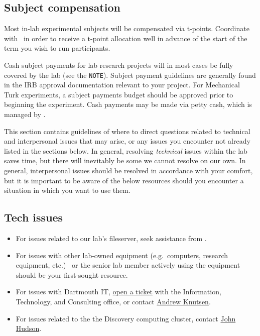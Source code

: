 \documentclass{tufte-book} %
\begin{document}
 \subsection{Subject compensation}
 Most in-lab experimental subjects will be compensated via t-points.
 Coordinate with \coordinator~in order to receive a t-point allocation
 well in advance of the start of the term you wish to run
 participants.

 Cash subject payments for lab research projects will in most cases be fully covered by
 the lab (see the \texttt{NOTE}).  Subject payment guidelines are generally found in the IRB
 approval documentation relevant to your project.  For Mechanical Turk
 experiments, a subject payments budget should be approved prior to
 beginning the experiment.  Cash payments may be made via petty cash,
 which is managed by \coordinator.



\noindent This section contains guidelines of where to direct questions related to technical and interpersonal issues that may arise, or any issues you encounter not already listed in the sections below. In general, resolving \textit{technical} issues within the lab saves time, but there will inevitably be some we cannot resolve on our own. In general, interpersonal issues should be resolved in accordance with your comfort, but it is important to be aware of the below resources should you encounter a situation in which you want to use them.

\subsection{Tech issues}
\begin{itemize}
\item For issues related to our lab's fileserver, seek assistance from \director.

\item For issues with other lab-owned equipment (e.g.~computers, research equipment, etc.) \coordinator~or the senior lab member actively using the equipment should be your first-sought resource.

\item For issues with Dartmouth IT, \href{help@dartmouth.edu}{open a ticket} with the Information, Technology, and Consulting office, or contact \href{mailto:Andrew.C.Knutsen@Dartmouth.edu}{Andrew Knutsen}.

\item For issues related to the the Discovery computing cluster, contact \href{mailto:John.P.Hudson@Dartmouth.edu}{John Hudson}.
\end{itemize}
\end{document}
